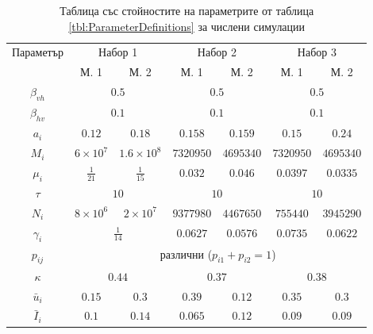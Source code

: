 \begin{table}[ht]
  \centering
  \begin{tabular}{ |c ||c c c c c c|  }
    \hline
    \multirow{2}{*}{Параметър}& \multicolumn{2}{c}{Набор 1}& \multicolumn{2}{c}{Набор 2} & \multicolumn{2}{c|}{Набор 3}\\
    & М. 1 & М. 2 & М. 1 & М. 2 & М. 1 & М. 2\\
    \hline
    $\beta_{vh}$ & \multicolumn{2}{c}{$0.5$} & \multicolumn{2}{c}{$0.5$}  & \multicolumn{2}{c|}{$0.5$}\\
    $\beta_{hv}$ & \multicolumn{2}{c}{$0.1$} & \multicolumn{2}{c}{$0.1$} & \multicolumn{2}{c|}{$0.1$}\\
    $a_i$ & $0.12$ & $0.18$ & $0.158$ & $0.159$ & $0.15$ & $0.24$\\
    $M_i$ & $6 \times 10^7$ & $1.6 \times 10^8$ & $7320950$ & $4695340$ & $7320950$ & $4695340$\\
    $\mu_i$ & $\frac{1}{21}$ & $\frac{1}{15}$ & $0.032$ & $0.046$ & $0.0397$ & $0.0335$\\
    $\tau$ & \multicolumn{2}{c}{$10$} & \multicolumn{2}{c}{$10$} & \multicolumn{2}{c|}{$10$}\\
    $N_i$ & $8 \times 10^6$ & $2 \times 10^7$ & $9377980$ & $4467650$ & $755440$ & $3945290$\\
    $\gamma_i$ & \multicolumn{2}{c}{$\frac{1}{14}$} & $0.0627$ & $0.0576$ & $0.0735$ & $0.0622$\\
    $p_{ij}$ & \multicolumn{6}{c|}{различни ($p_{i1}+p_{i2}=1$)}\\
    $\kappa$ & \multicolumn{2}{c}{$0.44$} & \multicolumn{2}{c}{$0.37$} & \multicolumn{2}{c|}{$0.38$}\\
    $\bar{u}_i$ & $0.15$ & $0.3$ & $0.39$ & $0.12$ & $0.35$ & $0.3$\\
    $\bar{I}_i$ & $0.1$ & $0.14$ & $0.065$ & $0.12$ & $0.09$ & $0.09$\\
    \hline
  \end{tabular}
  \caption{Таблица със стойностите на параметрите от таблица \ref{tbl:ParameterDefinitions} за числени симулации}
  \label{tbl:ParameterValues}
\end{table}


